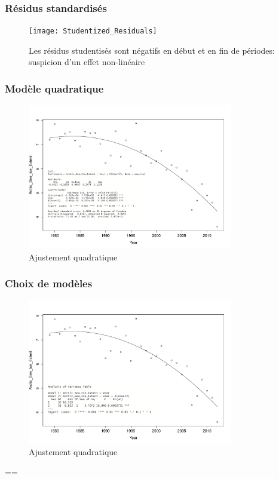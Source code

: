 \begin{frame}
\frametitle{Résidus standardisés}
\begin{figure}
  \centering
  \texttt{[image: Studentized\_Residuals]}
  \caption{Les résidus studentisés sont négatifs en début et en fin de périodes: suspicion d'un effet non-linéaire}
\end{figure}
\end{frame}

\begin{frame}
\frametitle{Modèle quadratique}
\begin{figure}
  \centering
  \includegraphics[width=0.8\textwidth]{sea_ice_quadratic}
  \caption{Ajustement quadratique}
\end{figure}
\end{frame}

\begin{frame}
\frametitle{Choix de modèles}
\begin{figure}
  \centering
  \includegraphics[width=0.8\textwidth]{sea_ice_quadratic2}
  \caption{Ajustement quadratique}
\end{figure}

\end{frame}






== 